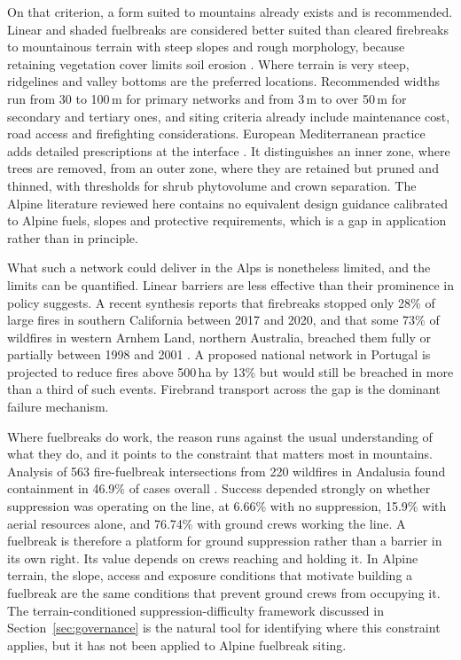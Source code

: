 \documentclass[11pt,a4paper]{article}
\begin{document}
On that criterion, a form suited to mountains already exists and is recommended. Linear and shaded fuelbreaks are considered better suited than cleared firebreaks to mountainous terrain with steep slopes and rough morphology, because retaining vegetation cover limits soil erosion \citep{ascoli_firebreak_2018}. Where terrain is very steep, ridgelines and valley bottoms are the preferred locations. Recommended widths run from 30 to 100\,m for primary networks and from 3\,m to over 50\,m for secondary and tertiary ones, and siting criteria already include maintenance cost, road access and firefighting considerations. European Mediterranean practice adds detailed prescriptions at the interface \citep{rigolot_recommendations_2003}. It distinguishes an inner zone, where trees are removed, from an outer zone, where they are retained but pruned and thinned, with thresholds for shrub phytovolume and crown separation. The Alpine literature reviewed here contains no equivalent design guidance calibrated to Alpine fuels, slopes and protective requirements, which is a gap in application rather than in principle.

What such a network could deliver in the Alps is nonetheless limited, and the limits can be quantified. Linear barriers are less effective than their prominence in policy suggests. A recent synthesis reports that firebreaks stopped only 28\% of large fires in southern California between 2017 and 2020, and that some 73\% of wildfires in western Arnhem Land, northern Australia, breached them fully or partially between 1998 and 2001 \citep{zong_effectiveness_2026}. A proposed national network in Portugal is projected to reduce fires above 500\,ha by 13\% but would still be breached in more than a third of such events. Firebrand transport across the gap is the dominant failure mechanism.

Where fuelbreaks do work, the reason runs against the usual understanding of what they do, and it points to the constraint that matters most in mountains. Analysis of 563 fire-fuelbreak intersections from 220 wildfires in Andalusia found containment in 46.9\% of cases overall \citep{ortega_modeling_2024}. Success depended strongly on whether suppression was operating on the line, at 6.66\% with no suppression, 15.9\% with aerial resources alone, and 76.74\% with ground crews working the line. A fuelbreak is therefore a platform for ground suppression rather than a barrier in its own right. Its value depends on crews reaching and holding it. In Alpine terrain, the slope, access and exposure conditions that motivate building a fuelbreak are the same conditions that prevent ground crews from occupying it. The terrain-conditioned suppression-difficulty framework discussed in Section~\ref{sec:governance} is the natural tool for identifying where this constraint applies, but it has not been applied to Alpine fuelbreak siting.
\end{document}
